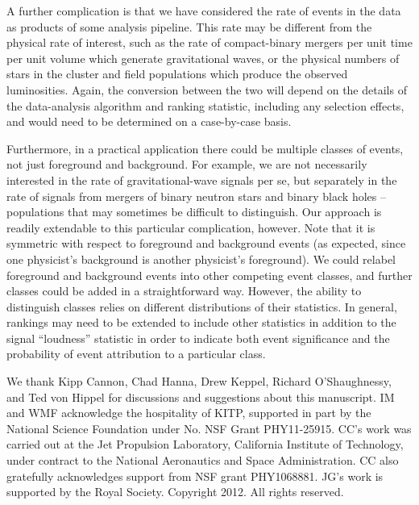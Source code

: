 \documentclass[aps,prd,reprint,nofootinbib]{revtex4-1}
\begin{document}
A further complication is that we have considered the rate of events
in the data as products of some analysis pipeline.  This rate may be
different from the physical rate of interest, such as the rate of
compact-binary mergers per unit time per unit volume which generate
gravitational waves, or the physical numbers of stars in the cluster
and field populations which produce the observed luminosities.  Again,
the conversion between the two will depend on the details of the
data-analysis algorithm and ranking statistic, including any selection
effects, and would need to be determined on a case-by-case basis.

Furthermore, in a practical application there could be multiple
classes of events, not just foreground and background.  For example,
we are not necessarily interested in the rate of gravitational-wave
signals per se, but separately in the rate of signals from mergers of
binary neutron stars and binary black holes -- populations that may
sometimes be difficult to distinguish.  Our approach is readily
extendable to this particular complication, however.  Note that it is
symmetric with respect to foreground and background events (as
expected, since one physicist's background is another physicist's
foreground).  We could relabel foreground and background events into
other competing event classes, and further classes could be added in a
straightforward way.  However, the ability to distinguish classes
relies on different distributions of their statistics.  In general,
rankings may need to be extended to include other statistics in
addition to the signal ``loudness'' statistic in order to indicate
both event significance and the probability of event attribution to a
particular class.

\begin{acknowledgments}
  We thank Kipp Cannon, Chad Hanna, Drew Keppel, Richard
  O'Shaughnessy, and Ted von Hippel for discussions and suggestions
  about this manuscript.  IM and WMF acknowledge the hospitality of KITP, supported in part by the National Science Foundation under No. NSF Grant PHY11-25915.  CC's work was carried out  at the Jet Propulsion Laboratory, California Institute of Technology, under contract to the National Aeronautics and Space Administration.  CC also gratefully acknowledges support from NSF grant PHY1068881.  JG's work is supported by the Royal Society.  Copyright 2012.  All rights reserved.
\end{acknowledgments}

 
\end{document}
